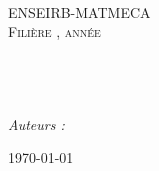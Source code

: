 \begin{titlepage}

\begin{center}


\begin{center}
\end{center}
~\\
~\\
~\\
\textsc{\LARGE ENSEIRB-MATMECA}\\[1cm]

\textsc{\Large {Filière \filiere, \annee année}}\\[0.5cm]

\HRule \\[0.4cm]
{ \Large \bfseries \titre}\\[0.4cm]
{ \huge \bfseries \soustitre}

\HRule \\[3.5cm]

\emph{Auteurs :}\\
\equipe

\vfill

{\large \today}

\end{center}

\end{titlepage}